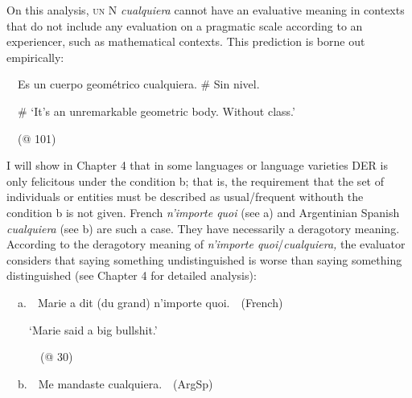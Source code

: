 \begin{styleStandard}
On this analysis, \textsc{un} N \textit{cualquiera} cannot have an evaluative meaning in contexts that do not include any evaluation on a pragmatic scale according to an experiencer, such as mathematical contexts. This prediction is borne out empirically:
\end{styleStandard}

\begin{styleStandard}
\ \ Es un cuerpo geométrico cualquiera. \# Sin nivel.
\end{styleStandard}

\begin{styleStandard}
\ \ \# ‘It’s an unremarkable geometric body. Without class.’
\end{styleStandard}

\begin{styleStandard}
\ \ (@ 101)
\end{styleStandard}

\begin{styleStandard}
I will show in Chapter 4 that in some languages or language varieties DER is only felicitous under the condition b; that is, the requirement that the set of individuals or entities must be described as usual/frequent withouth the condition b is not given. French \textit{n’importe quoi} (see a) and Argentinian Spanish \textit{cualquiera} (see b) are such a case. They have necessarily a deragotory meaning. According to the deragotory meaning of \textit{n’importe quoi}/\textit{cualquiera, }the evaluator considers that saying something undistinguished is worse than saying something distinguished (see Chapter 4 for detailed analysis):
\end{styleStandard}

\begin{styleStandard}
\label{bkm:Ref72355051}\ \ a.\ \ Marie a dit (du grand) n’importe quoi.\ \ (French)
\end{styleStandard}

\begin{styleStandard}
\ \ \ \ ‘Marie said a big bullshit.’\ \ 
\end{styleStandard}

\begin{styleStandard}
\ \ \ \ \ \ (@ 30)
\end{styleStandard}

\begin{styleStandard}
\ \ b.\ \ Me mandaste cualquiera.\ \ (ArgSp)
\end{styleStandard}


